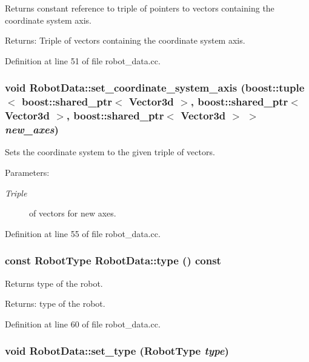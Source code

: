 Returns constant reference to triple of pointers to vectors containing the coordinate system axis. \begin{Desc}
\item[Returns:]Triple of vectors containing the coordinate system axis. \end{Desc}


Definition at line 51 of file robot\_\-data.cc.\hypertarget{class_robot_data_26807404a2503711944c55f4ed75dd2e}{
\subsubsection[set\_\-coordinate\_\-system\_\-axis]{\setlength{\rightskip}{0pt plus 5cm}void RobotData::set\_\-coordinate\_\-system\_\-axis (boost::tuple$<$ boost::shared\_\-ptr$<$ Vector3d $>$, boost::shared\_\-ptr$<$ Vector3d $>$, boost::shared\_\-ptr$<$ Vector3d $>$ $>$ {\em new\_\-axes})}}
\label{class_robot_data_26807404a2503711944c55f4ed75dd2e}


Sets the coordinate system to the given triple of vectors. \begin{Desc}
\item[Parameters:]
\begin{description}
\item[{\em Triple}]of vectors for new axes. \end{description}
\end{Desc}


Definition at line 55 of file robot\_\-data.cc.\hypertarget{class_robot_data_b83255012ce788fdbf9b277c775e0240}{
\subsubsection[type]{\setlength{\rightskip}{0pt plus 5cm}const RobotType RobotData::type () const}}
\label{class_robot_data_b83255012ce788fdbf9b277c775e0240}


Returns type of the robot. \begin{Desc}
\item[Returns:]type of the robot. \end{Desc}


Definition at line 60 of file robot\_\-data.cc.\hypertarget{class_robot_data_ac8292bb51a92b2c5c9a6a6e00529fce}{
\subsubsection[set\_\-type]{\setlength{\rightskip}{0pt plus 5cm}void RobotData::set\_\-type (RobotType {\em type})}}
\label{class_robot_data_ac8292bb51a92b2c5c9a6a6e00529fce}


